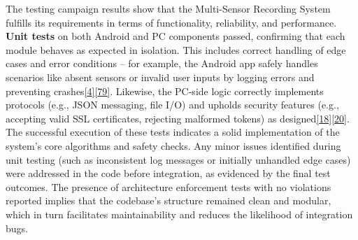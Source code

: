 \documentclass[12pt,a4paper]{article}
\begin{document}
The testing campaign results show that the Multi-Sensor Recording System fulfills its requirements in terms of functionality, reliability, and performance. \textbf{Unit tests} on both Android and PC components passed, confirming that each module behaves as expected in isolation. This includes correct handling of edge cases and error conditions -- for example, the Android app safely handles scenarios like absent sensors or invalid user inputs by logging errors and preventing crashes\href{https://github.com/buccancs/bucika_gsr/blob/7048f7f6a7536f5cd577ed2184800d3dad97fd08/AndroidApp/src/test/java/com/multisensor/recording/recording/ShimmerRecorderEnhancedTest.kt\#L79-L87}{{[}4{]}}\href{https://github.com/buccancs/bucika_gsr/blob/7048f7f6a7536f5cd577ed2184800d3dad97fd08/AndroidApp/src/test/java/com/multisensor/recording/recording/ShimmerRecorderEnhancedTest.kt\#L168-L176}{{[}79{]}}. Likewise, the PC-side logic correctly implements protocols (e.g., JSON messaging, file I/O) and upholds security features (e.g., accepting valid SSL certificates, rejecting malformed tokens) as designed\href{https://github.com/buccancs/bucika_gsr/blob/7048f7f6a7536f5cd577ed2184800d3dad97fd08/tests/security/test_tls_authentication.py\#L145-L153}{{[}18{]}}\href{https://github.com/buccancs/bucika_gsr/blob/7048f7f6a7536f5cd577ed2184800d3dad97fd08/tests/security/test_tls_authentication.py\#L157-L165}{{[}20{]}}. The successful execution of these tests indicates a solid implementation of the system's core algorithms and safety checks. Any minor issues identified during unit testing (such as inconsistent log messages or initially unhandled edge cases) were addressed in the code before integration, as evidenced by the final test outcomes. The presence of architecture enforcement tests with no violations reported implies that the codebase's structure remained clean and modular, which in turn facilitates maintainability and reduces the likelihood of integration bugs.
\end{document}
